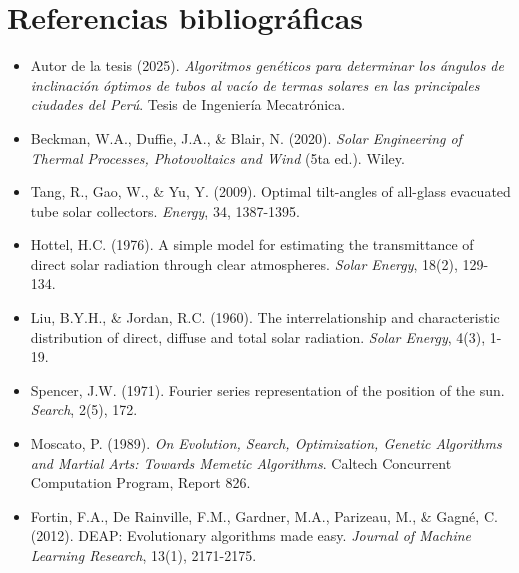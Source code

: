 \documentclass[11pt,a4paper]{article}
\begin{document}
\section{Referencias bibliográficas}

\begin{itemize}[nosep]
  \item Autor de la tesis (2025). \emph{Algoritmos genéticos para determinar
        los ángulos de inclinación óptimos de tubos al vacío de termas
        solares en las principales ciudades del Perú}. Tesis de Ingeniería
        Mecatrónica.
  \item Beckman, W.A., Duffie, J.A., \& Blair, N. (2020). \emph{Solar
        Engineering of Thermal Processes, Photovoltaics and Wind} (5ta ed.).
        Wiley.
  \item Tang, R., Gao, W., \& Yu, Y. (2009). Optimal tilt-angles of
        all-glass evacuated tube solar collectors. \emph{Energy}, 34,
        1387-1395.
  \item Hottel, H.C. (1976). A simple model for estimating the transmittance
        of direct solar radiation through clear atmospheres. \emph{Solar
        Energy}, 18(2), 129-134.
  \item Liu, B.Y.H., \& Jordan, R.C. (1960). The interrelationship and
        characteristic distribution of direct, diffuse and total solar
        radiation. \emph{Solar Energy}, 4(3), 1-19.
  \item Spencer, J.W. (1971). Fourier series representation of the position
        of the sun. \emph{Search}, 2(5), 172.
  \item Moscato, P. (1989). \emph{On Evolution, Search, Optimization,
        Genetic Algorithms and Martial Arts: Towards Memetic Algorithms}.
        Caltech Concurrent Computation Program, Report 826.
  \item Fortin, F.A., De Rainville, F.M., Gardner, M.A., Parizeau, M., \&
        Gagné, C. (2012). DEAP: Evolutionary algorithms made easy.
        \emph{Journal of Machine Learning Research}, 13(1), 2171-2175.
\end{itemize}
\end{document}
